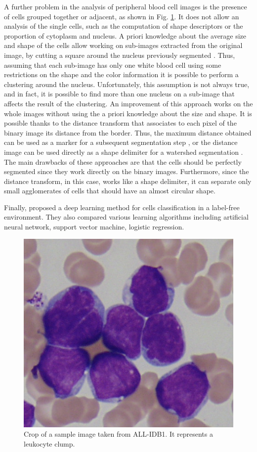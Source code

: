 \documentclass[final,a4paper,12pt,english]{UnicaPhdThesis3}
\begin{document}
A further problem in the analysis of peripheral blood cell images is the presence of cells grouped together or adjacent, as shown in Fig. \ref{fig_clumps}. It does not allow an analysis of the single cells, such as the computation of shape descriptors or the proportion of cytoplasm and nucleus. A priori knowledge about the average size and shape of the cells allow working on sub-images extracted from the original image, by cutting a square around the nucleus previously segmented \cite{Kovalev, Sinha}. Thus, assuming that each sub-image has only one white blood cell using some restrictions on the shape and the color information it is possible to perform a clustering around the nucleus. Unfortunately, this assumption is not always true, and in fact, it is possible to find more than one nucleus on a sub-image that affects the result of the clustering. An improvement of this approach works on the whole images without using the a priori knowledge about the size and shape. It is possible thanks to the distance transform \cite{Maurer} that associates to each pixel of the binary image its distance from the border. Thus, the maximum distance obtained can be used as a marker for a subsequent segmentation step \cite{Malpica}, or the distance image can be used directly as a shape delimiter for a watershed segmentation \cite{Lindblad}. The main drawbacks of these approaches are that the cells should be perfectly segmented since they work directly on the binary images. Furthermore, since the distance transform, in this case, works like a shape delimiter, it can separate only small agglomerates of cells that should have an almost circular shape.

Finally, \cite{Chen2016} proposed a deep learning method for cells classification in a label-free environment. They also compared various learning algorithms including artificial neural network, support vector machine, logistic regression.

\begin{figure}[h]
	\centering
	\includegraphics[height=0.25\textwidth]{images/2016_1_mva/clump}
	\caption{\label{fig_clumps}Crop of a sample image taken from ALL-IDB1. It represents a leukocyte clump.}
\end{figure}
\end{document}
